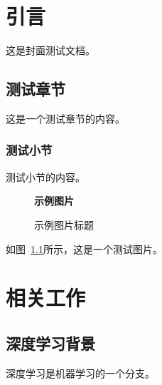 \documentclass[degree=bachelor]{sduthesis}
\begin{document}
\MakeCover

\chapter{引言}
\label{cha:intro}

这是封面测试文档。

\section{测试章节}
\label{sec:test}

这是一个测试章节的内容。

\subsection{测试小节}

测试小节的内容。

\begin{figure}[htbp]
  \centering
  \textbf{示例图片}
  \caption{示例图片标题}
  \label{fig:example}
\end{figure}

如图~\ref{fig:example}所示，这是一个测试图片。

\chapter{相关工作}
\label{cha:related}

\section{深度学习背景}

深度学习是机器学习的一个分支。


\end{document}
